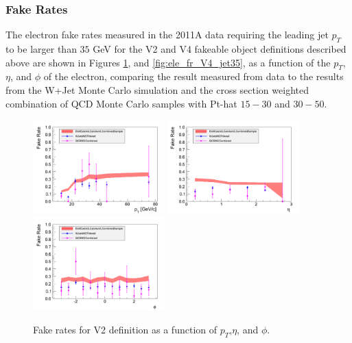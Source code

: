 \subsubsection{Fake Rates}
The electron fake rates measured in the 2011A data requiring the leading jet $p_{T}$ to be 
larger than $35$ GeV for the V2 and V4 fakeable object definitions described above are shown 
in Figures \ref{fig:ele_fr_V2_jet35}, and \ref{fig:ele_fr_V4_jet35}, as a function of the 
$p_{T}$, $\eta$, and $\phi$ of the electron, comparing the result measured from data to the
results from the W+Jet Monte Carlo simulation and the cross section weighted combination 
of QCD Monte Carlo samples with Pt-hat $15-30$ and $30-50$.


\begin{figure}[!htbp]
\begin{center}
\includegraphics[width=0.45\textwidth]{figures/ElectronFakeRate_DenominatorV2_ptThreshold35_Pt.pdf}
\includegraphics[width=0.45\textwidth]{figures/ElectronFakeRate_DenominatorV2_ptThreshold35_Eta.pdf}
\includegraphics[width=0.45\textwidth]{figures/ElectronFakeRate_DenominatorV2_ptThreshold35_Phi.pdf}
\caption{Fake rates for V2 definition as a function of $p_T$,$\eta$, and $\phi$.}
\label{fig:ele_fr_V2_jet35}
\end{center}
\end{figure}



